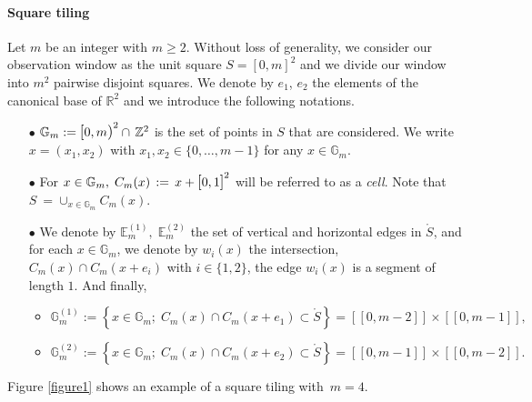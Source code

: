 \documentclass[12pt]{article}
\theoremstyle{Theorem}
\theoremstyle{definition}
\begin{document}
\paragraph{Square tiling}
Let $m$ be an integer with $m \geq 2$. Without loss of generality, we consider our observation window as the unit square $S = [0,m]^{2}$ and  we divide our window into $m^{2}$ pairwise disjoint squares. We denote by $e_1$, $e_{2}$ the elements of the canonical base of $\mathbb{R}^{2}$ and we introduce the following notations.
\begin{itemize}
 \item[$\bullet$] $\mathbb{G}_{m} := \text{\larger[1]{$[$}}0, m \text{\larger[1]{$)$}}^{2} \cap \, \mathbb{Z}^{2}$ is the set of points in $S$ that are considered. We write $x = (x_1, x_2)$ with $x_1, x_2 \in \{0,\ldots, m-1\}$ for any $x\in \mathbb{G}_{m}$.
 \item[$\bullet$] For $x\in \mathbb{G}_{m}, \; C_{m}(x) \, := \,x + \text{\larger[1]{$[$}}0, 1 \text{\larger[1]{$]$}}^{2}$ will be referred to as a \textit{cell}. Note that $S~= \cup_{x \in \mathbb{G}_{m}} C_{m}(x)$.
\item[$\bullet$] We denote by  $\mathbb{E}^{(1)}_{m}, \; \mathbb{E}^{(2)}_{m} $ the set of vertical and horizontal edges in $\mathring{S}$, and for each $x \in \mathbb{G}_{m}$, we denote by $w_{i}(x)$ the intersection, $C_{m}(x) \cap C_{m}(x+e_{i})$ with $ i \in \{1, 2\}$, the edge $w_{i}(x)$  is a segment of length $1$. And finally, 
\begin{itemize}
\item 
$\mathbb{G}^{(1)}_{m} := \left\{ x \in \mathbb{G}_{m}; \; C_{m}(x)\cap C_{m}(x + e_{1}) \subset \mathring{S} \right\} = [\![0,m-2]\!]\times[\![0,m-1]\!], $ \\
\item $\mathbb{G}^{(2)}_{m} := \left\{ x \in \mathbb{G}_{m}; \; C_{m}(x)\cap C_{m}(x + e_{2}) \subset \mathring{S} \right\} = [\![0,m-1]\!]\times[\![0,m-2]\!]. $ \\
\end{itemize}
\end{itemize}
Figure \ref{figure1} shows an example of a square tiling with~$m = 4$.
\end{document}
